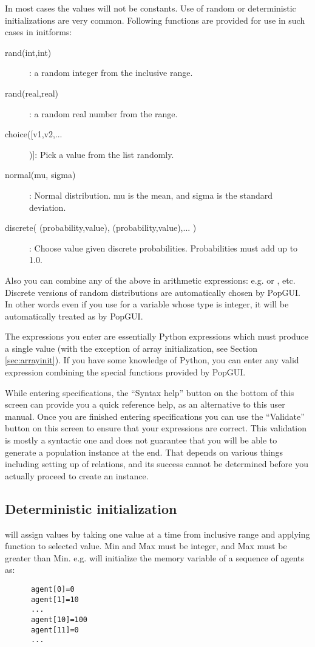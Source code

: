 In most cases the values will not be constants. Use of random or deterministic initializations are very common. Following functions are provided for use in such cases in initforms:
\begin{description}  
   \item[rand(int,int)]: a random integer from the inclusive range.
   \item[rand(real,real)]: a random real number from the range.
   \item[choice([v1,v2,...])]: Pick a value from the list randomly.
   \item[normal(mu, sigma)]: Normal distribution. mu is the mean, and sigma is the standard deviation. 
   \item[discrete( (probability,value), (probability,value),... )]: Choose value given discrete probabilities. Probabilities must add up to 1.0.
\end{description}

Also you can combine any of the above in arithmetic expressions: e.g.  or , etc. Discrete versions of random distributions are automatically chosen by PopGUI. In other words even if you use  for a variable whose type is integer, it will be automatically treated as   by PopGUI.

The expressions you enter are essentially Python expressions which must produce a single value (with the exception of array initialization, see Section \ref{sec:arrayinit}). If you have some knowledge of Python, you can enter any valid expression combining the special functions provided by PopGUI. 

While entering specifications, the ``Syntax help'' button on the bottom of this screen can provide you a quick reference help, as an alternative to this user manual. Once you are finished entering specifications you can use the ``Validate'' button on this screen to ensure that your expressions are correct. This validation is mostly a syntactic one and does not guarantee that you will be able to generate a population instance at the end. That depends on various things including setting up of relations, and its success cannot be determined before you actually proceed to create an instance.

\subsection{Deterministic initialization}
 will assign values by taking one value at a time from inclusive range and applying function to selected value. Min and Max must be integer, and Max must be greater than Min. e.g.  will initialize the memory variable of a sequence of agents as:
     \begin{verbatim}
      agent[0]=0
      agent[1]=10
      ...
      agent[10]=100
      agent[11]=0
      ...
     \end{verbatim}
